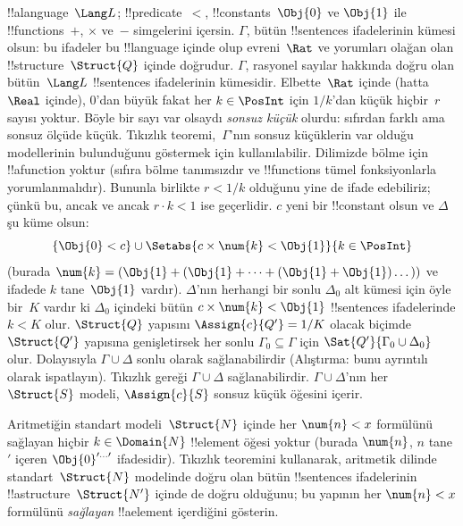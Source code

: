 \documentclass[../../../include/open-logic-section]{subfiles}
\begin{document}
{\begin{ex}
!!a{language}~$\Lang L$; !!{predicate}~$<$, !!{constant}s~$\Obj{0}$ ve
$\Obj{1}$ ile !!{function}s~$+$, $\times$ ve~$-$ simgelerini içersin.
$\Gamma$, bütün !!{sentence}s ifadelerinin kümesi olsun: bu ifadeler
bu !!{language} içinde olup evreni~$\Rat$ ve yorumları olağan olan
!!{structure}~$\Struct{Q}$ içinde doğrudur. $\Gamma$, rasyonel sayılar
hakkında doğru olan bütün~$\Lang L$ !!{sentence}s ifadelerinin kümesidir.
Elbette~$\Rat$ içinde (hatta~$\Real$ içinde), $0$'dan
büyük fakat her $k\in\PosInt$ için $1/k$'dan küçük hiçbir~$r$ sayısı
yoktur. Böyle bir sayı var olsaydı \emph{sonsuz küçük} olurdu: sıfırdan
farklı ama sonsuz ölçüde küçük. Tıkızlık teoremi,~$\Gamma$'nın sonsuz
küçüklerin var olduğu modellerinin bulunduğunu göstermek için
kullanılabilir. Dilimizde bölme için !!a{function} yoktur (sıfıra bölme
tanımsızdır ve !!{function}s tümel fonksiyonlarla yorumlanmalıdır).
Bununla birlikte $r<1/k$ olduğunu yine de ifade edebiliriz; çünkü bu,
ancak ve ancak $r\cdot k<1$ ise geçerlidir. $c$ yeni bir !!{constant}
olsun ve $\Delta$ şu küme olsun:
\[
\{\Obj{0}<c\}\cup
\Setabs{c\times\num{k}<\Obj{1}}{k\in\PosInt}
\]
(burada $\num{k}=(\Obj{1}+(\Obj{1}+\dots+(\Obj{1}+\Obj{1})\dots))$
ve ifadede $k$ tane~$\Obj{1}$ vardır). $\Delta$'nın herhangi bir sonlu
$\Delta_0$ alt kümesi için öyle bir~$K$ vardır ki $\Delta_0$ içindeki
bütün $c\times\num{k}<\Obj{1}$ !!{sentence}s ifadelerinde $k<K$ olur.
$\Struct{Q}$ yapısını $\Assign{c}{Q'}=1/K$ olacak biçimde
$\Struct{Q'}$ yapısına genişletirsek her sonlu $\Gamma_0\subseteq
\Gamma$ için $\Sat{Q'}{\Gamma_0\cup\Delta_0}$ olur. Dolayısıyla
$\Gamma\cup\Delta$ sonlu olarak sağlanabilirdir (Alıştırma: bunu
ayrıntılı olarak ispatlayın). Tıkızlık gereği $\Gamma\cup\Delta$
sağlanabilirdir. $\Gamma\cup\Delta$'nın her~$\Struct{S}$ modeli,
$\Assign{c}{S}$ sonsuz küçük öğesini içerir.
\end{ex}
}{}

\begin{prob}
Aritmetiğin standart modeli~$\Struct{N}$ içinde her $\num{n}<x$
formülünü sağlayan hiçbir $k\in\Domain{N}$ !!{element} öğesi yoktur
(burada $\num{n}$, $n$ tane $\prime$ içeren
$\Obj{0}^{\prime\dots\prime}$ ifadesidir). Tıkızlık teoremini kullanarak,
aritmetik dilinde standart~$\Struct{N}$ modelinde doğru olan bütün
!!{sentence}s ifadelerinin !!a{structure}~$\Struct{N'}$ içinde de doğru
olduğunu; bu yapının her $\num{n}<x$ formülünü \emph{sağlayan}
!!a{element} içerdiğini gösterin.
\end{prob}
\tagendprob
\end{document}
